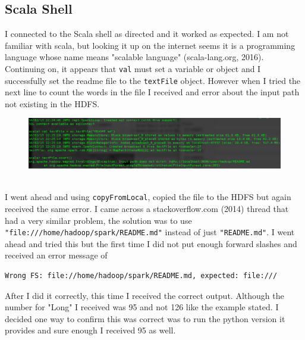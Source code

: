 \documentclass[10pt]{article}
\begin{document}
\subsection*{Scala Shell}
I connected to the Scala shell as directed and it worked as expected. I am not familiar with scala, but looking it up on the internet seems it is a programming language whose name means "scalable language" (scala-lang.org, 2016). Continuing on, it appears that \verb|val| must set a variable or object and I successfully set the readme file to the \verb|textFile| object. However when I tried the next line to count the words in the file I received and error about the input path not existing in the HDFS.
\begin{figure}[!h]
\includegraphics[scale=0.37]{input_path.png}
\centering
\end{figure}\\
\indent I went ahead and using \verb|copyFromLocal|, copied the file to the HDFS but again received the same error. I came across a stackoverflow.com (2014) thread that had a very similar problem, the solution was to use \verb|"file:///home/hadoop/spark/README.md"| instead of just \verb|"README.md"|. I went ahead and tried this but the first time I did not put enough forward slashes and received an error message of 
\begin{verbatim}
Wrong FS: file://home/hadoop/spark/README.md, expected: file:///
\end{verbatim}
After I did it correctly, this time I received the correct output. Although the number for "Long" I received was 95 and not 126 like the example stated. I decided one way to confirm this was correct was to run the python version it provides and sure enough I received 95 as well.
\par
{}%
\end{document}
